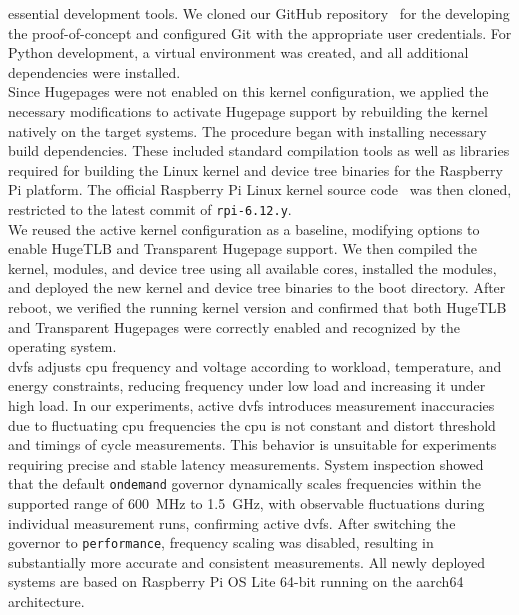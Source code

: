     essential development tools. We cloned our GitHub repository~\cite{toolHamOnRaspi} for the developing the proof-of-concept and configured Git 
    with the appropriate user credentials.
    For Python development, a virtual environment was created, and all additional dependencies were installed.
    \\
    Since Hugepages were not enabled on this kernel configuration, we applied the necessary 
    modifications to activate Hugepage support by rebuilding the kernel natively on the target systems.
    The procedure began with installing necessary build dependencies. These included standard compilation tools 
    as well as libraries required for building the Linux kernel and device tree binaries for the Raspberry Pi 
    platform. The official Raspberry Pi Linux kernel source code~\cite{toolLinuxKernel} was then cloned, restricted to the latest 
    commit of \texttt{rpi-6.12.y}.
    \\
    We reused the active kernel configuration as a baseline, modifying options to enable HugeTLB and 
    Transparent Hugepage support. We then compiled the kernel, modules, and device tree using all available 
    cores, installed the modules, and deployed the new kernel and device tree binaries to the boot directory. 
    After reboot, we verified the running kernel version and confirmed that both HugeTLB and Transparent 
    Hugepages were correctly enabled and recognized by the operating system.
    \\
    \gls{dvfs} adjusts \gls{cpu} frequency and voltage according to workload, 
    temperature, and energy constraints, reducing frequency under low load and increasing it under high load. 
    In our experiments, active \gls{dvfs} introduces measurement inaccuracies due to fluctuating \gls{cpu} frequencies the 
    \gls{cpu} is not constant and distort threshold and timings of cycle measurements. This behavior is unsuitable 
    for experiments requiring precise and stable latency measurements. System inspection showed that the 
    default \texttt{ondemand}  governor dynamically scales frequencies within the supported range of 600~MHz to 
    1.5~GHz, with observable fluctuations during individual measurement runs, confirming active \gls{dvfs}. After 
    switching the governor to \texttt{performance}, frequency scaling was disabled, resulting in substantially more 
    accurate and consistent measurements.
    All newly deployed systems are based on Raspberry Pi OS Lite 64-bit running on the aarch64 architecture. 

